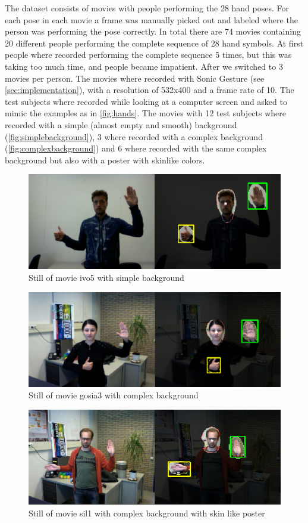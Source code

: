 The dataset consists of movies with people performing the 28 hand poses. For each pose in each movie a frame was manually picked out and labeled where the person was performing the pose correctly. In total there are 74 movies containing 20 different people performing the complete sequence of 28 hand symbols. At first people where recorded performing the complete sequence 5 times, but this was taking too much time, and people became impatient. After we switched to 3 movies per person. The movies where recorded with Sonic Gesture (see \autoref{sec:implementation}), with a resolution of 532x400 and a frame rate of 10. The test subjects where recorded while looking at a computer screen and asked to mimic the examples as in \autoref{fig:hands}. The movies with 12 test subjects where recorded with a simple (almost empty and smooth) background (\autoref{fig:simplebackground}), 3 where recorded with a complex background (\autoref{fig:complexbackground}) and 6 where recorded with the same complex background but also with a poster with skinlike colors.

\begin{figure}[htbp]
\center{}
\includegraphics[width=0.8\linewidth]{figures/simple.png}
\caption{Still of movie ivo5 with simple background}
\label{fig:simplebackground}
\end{figure}

\begin{figure}[htbp]
\center{}
\includegraphics[width=0.8\linewidth]{figures/complex.png}
\caption{Still of movie gosia3 with complex background}
\label{fig:complexbackground}
\end{figure}

\begin{figure}[htbp]
\center{}
\includegraphics[width=0.8\linewidth]{figures/complexposter.png}
\caption{Still of movie sil1 with complex background with skin like poster}
\label{fig:complexposterbackground}
\end{figure}


